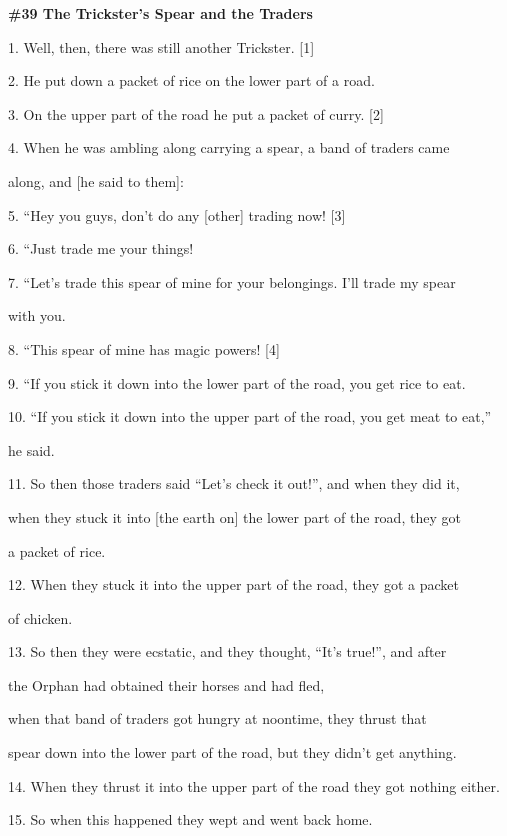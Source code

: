 
{\LARGE{}\textbf{\#39 The Trickster's Spear and the Traders}}

{\LARGE{}1. Well, then, there was still another Trickster. [1]}

{\LARGE{}2. He put down a packet of rice on the lower part of a road.}

{\LARGE{}3. On the upper part of the road he put a packet of curry. [2]}

{\LARGE{}4. When he was ambling along carrying a spear, a band of traders came
}

{\LARGE{}along, and [he said to them]:}

{\LARGE{}5. ``Hey you guys, don't do any [other] trading now! [3]}

{\LARGE{}6. ``Just trade me your things!}

{\LARGE{}7. ``Let's trade this spear of mine for your belongings. I'll
trade my spear      }

{\LARGE{}with you.}

{\LARGE{}8. ``This spear of mine has magic powers! [4]}

{\LARGE{}9. ``If you stick it down into the lower part of the road, you
get rice to eat.}

{\LARGE{}10. ``If you stick it down into the upper part of the road, you
get meat to eat,''       }

{\LARGE{}he said.}

{\LARGE{}11. So then those traders said ``Let's check it out!'', and when they
did it,      }

{\LARGE{}when they stuck it into [the earth on] the lower part of the road, they
got       }

{\LARGE{}a packet of rice.}

{\LARGE{}12. When they stuck it into the upper part of the road, they got a packet
}

{\LARGE{}of chicken.}

{\LARGE{}13. So then they were ecstatic, and they thought, ``It's true!'', and
after      }

{\LARGE{}the Orphan had obtained their horses and had fled,       }

{\LARGE{}when that band of traders got hungry at noontime, they thrust that
}

{\LARGE{}spear down into the lower part of the road, but they didn't get anything.}

{\LARGE{}14. When they thrust it into the upper part of the road they got nothing
either.}

{\LARGE{}15. So when this happened they wept and went back home.}

